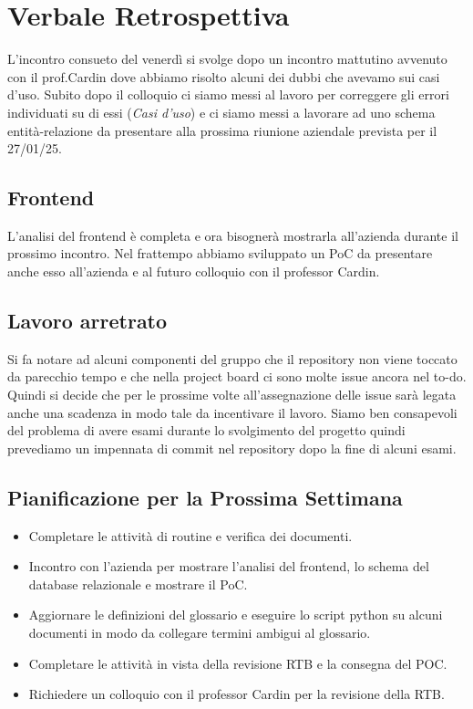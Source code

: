 \documentclass{article}
\begin{document}
\section{Verbale Retrospettiva}
L'incontro consueto del venerdì si svolge dopo un incontro mattutino avvenuto con il prof.Cardin
dove abbiamo risolto alcuni dei dubbi che avevamo sui casi d'uso. Subito dopo il colloquio ci siamo messi al lavoro
per correggere gli errori individuati su di essi (\textit{Casi d'uso}) e ci siamo messi a lavorare ad uno schema entità-relazione da presentare alla prossima riunione aziendale
prevista per il 27/01/25.
\subsection{Frontend}
L'analisi del frontend è completa e ora bisognerà mostrarla all'azienda durante il prossimo incontro. Nel frattempo abbiamo sviluppato un PoC da presentare anche esso all'azienda e al futuro colloquio con il professor Cardin.
\subsection{Lavoro arretrato}
Si fa notare ad alcuni componenti del gruppo che il repository non viene toccato da parecchio tempo e che nella project board ci sono molte issue ancora nel to-do. Quindi si decide che per le prossime volte all'assegnazione delle issue sarà legata anche una scadenza
in modo tale da incentivare il lavoro. Siamo ben consapevoli del problema di avere esami durante lo svolgimento del progetto quindi prevediamo un impennata di commit nel repository dopo la fine di alcuni esami.

\subsection{Pianificazione per la Prossima Settimana}
\begin{itemize}
    \item Completare le attività di routine e verifica dei documenti.
    \item Incontro con l'azienda per mostrare l'analisi del frontend, lo schema del database relazionale e mostrare il PoC.
    \item Aggiornare le definizioni del glossario e eseguire lo script python su alcuni documenti in modo da collegare termini ambigui al glossario.
    \item Completare le attività in vista della revisione RTB e la consegna del POC.
    \item Richiedere un colloquio con il professor Cardin per la revisione della RTB.
\end{itemize}
\end{document}
